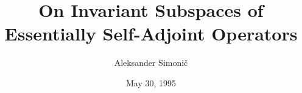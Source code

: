 \documentclass[titlepage]{slides}
\begin{document}
\title{On Invariant Subspaces of
       Essentially Self-Adjoint Operators }
\author{Aleksander Simoni\v{c}}
\date{May 30, 1995}
\maketitle

\end{document}
